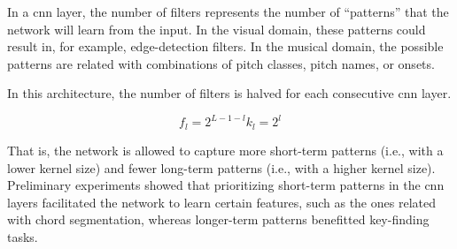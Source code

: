 
In a \gls{cnn} layer, the number of filters represents the
number of ``patterns'' that the network will learn from the
input. In the visual domain, these patterns could result in,
for example, edge-detection filters. In the musical domain,
the possible patterns are related with combinations of pitch
classes, pitch names, or onsets.

In this architecture, the number of filters is halved for
each consecutive \gls{cnn} layer. 

\begin{equation}
    \label{eq:filters_kernel}
    f_l = 2^{L - 1 - l}
    k_l = 2^{l}
\end{equation}

That is, the network is
allowed to capture more short-term patterns (i.e., with a
lower kernel size) and fewer long-term patterns (i.e., with
a higher kernel size). Preliminary experiments showed that
prioritizing short-term patterns in the \gls{cnn} layers
facilitated the network to learn certain features, such as
the ones related with chord segmentation, whereas
longer-term patterns benefitted key-finding tasks.
